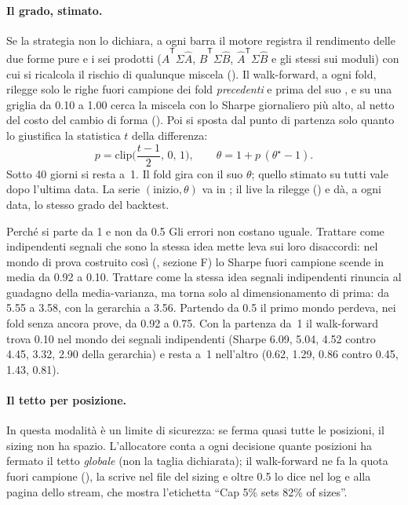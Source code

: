 \paragraph{Il grado, stimato.} Se la strategia non lo dichiara, a ogni barra
il motore registra il rendimento delle due forme pure e i sei prodotti
($\hat A^{\mathsf T}\Sigma\hat A$, $\hat B^{\mathsf T}\Sigma\hat B$,
$\hat A^{\mathsf T}\Sigma\hat B$ e gli stessi sui moduli) con cui si ricalcola
il rischio di qualunque miscela (). Il walk-forward,
a ogni fold, rilegge solo le righe fuori campione dei fold \emph{precedenti}
e prima del suo , e su una griglia da \num{0.10} a \num{1.00}
cerca la miscela con lo Sharpe giornaliero più alto, al netto del costo del
cambio di forma (). Poi si sposta dal punto di
partenza solo quanto lo giustifica la statistica $t$ della differenza:
\[
  p = \mathrm{clip}\Big(\frac{t-1}{2},\,0,\,1\Big),
  \qquad
  \theta = 1 + p\,(\theta^\star - 1).
\]
Sotto \num{40} giorni si resta a~1. Il fold gira con il suo $\theta$; quello
stimato su tutti vale dopo l'ultima data. La serie $(\text{inizio},\theta)$ va
in ; il live la rilegge
() e  dà, a ogni data, lo
stesso grado del backtest.

\begin{perche}{Perché si parte da 1 e non da 0.5}
Gli errori non costano uguale. Trattare come indipendenti segnali che sono la
stessa idea mette leva sui loro disaccordi: nel mondo di prova costruito così
(, sezione F) lo Sharpe fuori campione
scende in media da \num{0.92} a \num{0.10}. Trattare come la stessa idea
segnali indipendenti rinuncia al guadagno della media-varianza, ma torna solo
al dimensionamento di prima: da \num{5.55} a \num{3.58}, con la gerarchia a
\num{3.56}. Partendo da \num{0.5} il primo mondo perdeva, nei fold senza
ancora prove, da \num{0.92} a \num{0.75}. Con la partenza da~1 il walk-forward
trova \num{0.10} nel mondo dei segnali indipendenti (Sharpe \num{6.09},
\num{5.04}, \num{4.52} contro \num{4.45}, \num{3.32}, \num{2.90} della
gerarchia) e resta a~1 nell'altro (\num{0.62}, \num{1.29}, \num{0.86} contro
\num{0.45}, \num{1.43}, \num{0.81}).
\end{perche}

\paragraph{Il tetto per posizione.} In questa modalità
 è un limite di sicurezza: se ferma quasi tutte le
posizioni, il sizing non ha spazio. L'allocatore conta a ogni decisione quante
posizioni ha fermato il tetto \emph{globale} (non la taglia dichiarata); il
walk-forward ne fa la quota fuori campione (), la
scrive nel file del sizing e oltre \num{0.5} lo dice nel log e alla pagina
dello stream, che mostra l'etichetta \enquote{Cap 5\% sets 82\% of sizes}.

